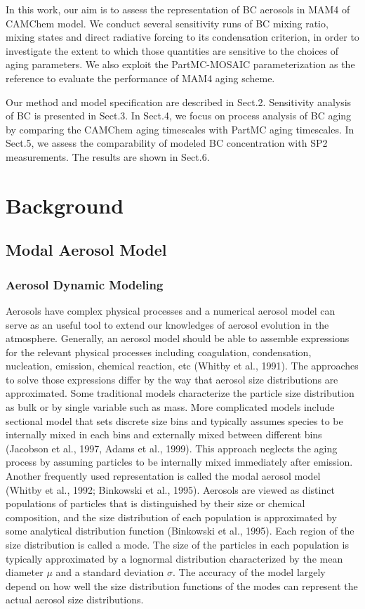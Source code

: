\documentclass[12pt]{article}
\begin{document}
	In this work, our aim is to assess the representation of BC aerosols in MAM4 of CAMChem model. We conduct several sensitivity runs of BC mixing ratio, mixing states and direct radiative forcing to its condensation criterion, in order to investigate the extent to which those quantities are sensitive to the choices of aging parameters. We also exploit the PartMC-MOSAIC parameterization as the reference to evaluate the performance of MAM4 aging scheme. 

	Our method and model specification are described in Sect.2. Sensitivity analysis of BC is presented in Sect.3. In Sect.4, we focus on process analysis of BC aging by comparing the CAMChem aging timescales with PartMC aging timescales. In Sect.5, we assess the comparability of modeled BC concentration with SP2 measurements. The results are shown in Sect.6. 

	\section{Background}
	
	\subsection{Modal Aerosol Model}
	\subsubsection{Aerosol Dynamic Modeling}
		Aerosols have complex physical processes and a numerical aerosol model can serve as an useful tool to extend our knowledges of aerosol evolution in the atmosphere. Generally, an aerosol model should be able to assemble expressions for the relevant physical processes including coagulation, condensation, nucleation, emission, chemical reaction, etc (Whitby et al., 1991). The approaches to solve those expressions differ by the way that aerosol size distributions are approximated. Some traditional models characterize the particle size distribution as bulk or by single variable such as mass. More complicated models include sectional model that sets discrete size bins and typically assumes species to be internally mixed in each bins and externally mixed between different bins (Jacobson et al., 1997, Adams et al., 1999). This approach neglects the aging process by assuming particles to be internally mixed immediately after emission. Another frequently used representation is called the modal aerosol model (Whitby et al., 1992; Binkowski et al., 1995). Aerosols are viewed as distinct populations of particles that is distinguished by their size or chemical composition, and the size distribution of each population is approximated by some analytical distribution function (Binkowski et al., 1995). Each region of the size distribution is called a mode. The size of the particles in each population is typically approximated by a lognormal distribution characterized by the mean diameter $\mu$ and a standard deviation $\sigma$. The accuracy of the model largely depend on how well the size distribution functions of the modes can represent the actual aerosol size distributions.  
	
\end{document}
